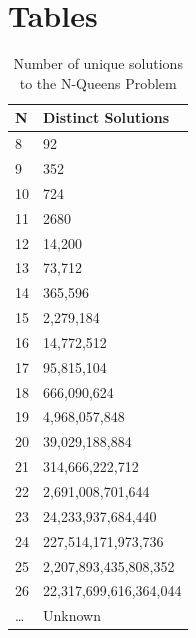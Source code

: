 \documentclass{sig-alternate}
\begin{document}

\appendix
\section{Tables}
\begin{table}[!h]
\centering
\caption{Number of unique solutions to the N-Queens Problem}
\begin{tabular}{|l|l|} \hline
N & Distinct Solutions      \\ \hline
8  & 92                     \\
9  & 352                    \\
10 & 724                    \\
11 & 2680                   \\
12 & 14,200                 \\
13 & 73,712                 \\
14 & 365,596                \\
15 & 2,279,184              \\
16 & 14,772,512             \\
17 & 95,815,104             \\
18 & 666,090,624            \\
19 & 4,968,057,848          \\
20 & 39,029,188,884         \\
21 & 314,666,222,712        \\
22 & 2,691,008,701,644      \\
23 & 24,233,937,684,440     \\
24 & 227,514,171,973,736    \\
25 & 2,207,893,435,808,352  \\
26 & 22,317,699,616,364,044 \\
\dots & Unknown				\\
\hline\end{tabular}
\label{table:numuniquesol}
\end{table}
\end{document}
